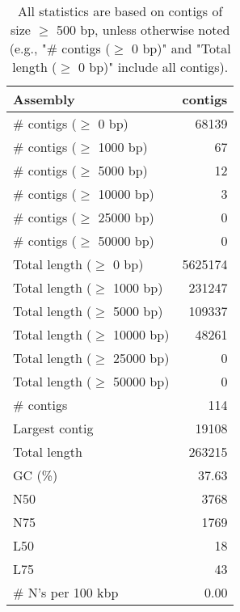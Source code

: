 \documentclass[12pt,a4paper]{article}
\begin{document}
\begin{table}[ht]
\begin{center}
\caption{All statistics are based on contigs of size $\geq$ 500 bp, unless otherwise noted (e.g., "\# contigs ($\geq$ 0 bp)" and "Total length ($\geq$ 0 bp)" include all contigs).}
\begin{tabular}{|l*{1}{|r}|}
\hline
Assembly & contigs \\ \hline
\# contigs ($\geq$ 0 bp) & 68139 \\ \hline
\# contigs ($\geq$ 1000 bp) & 67 \\ \hline
\# contigs ($\geq$ 5000 bp) & 12 \\ \hline
\# contigs ($\geq$ 10000 bp) & 3 \\ \hline
\# contigs ($\geq$ 25000 bp) & 0 \\ \hline
\# contigs ($\geq$ 50000 bp) & 0 \\ \hline
Total length ($\geq$ 0 bp) & 5625174 \\ \hline
Total length ($\geq$ 1000 bp) & 231247 \\ \hline
Total length ($\geq$ 5000 bp) & 109337 \\ \hline
Total length ($\geq$ 10000 bp) & 48261 \\ \hline
Total length ($\geq$ 25000 bp) & 0 \\ \hline
Total length ($\geq$ 50000 bp) & 0 \\ \hline
\# contigs & 114 \\ \hline
Largest contig & 19108 \\ \hline
Total length & 263215 \\ \hline
GC (\%) & 37.63 \\ \hline
N50 & 3768 \\ \hline
N75 & 1769 \\ \hline
L50 & 18 \\ \hline
L75 & 43 \\ \hline
\# N's per 100 kbp & 0.00 \\ \hline
\end{tabular}
\end{center}
\end{table}
\end{document}
